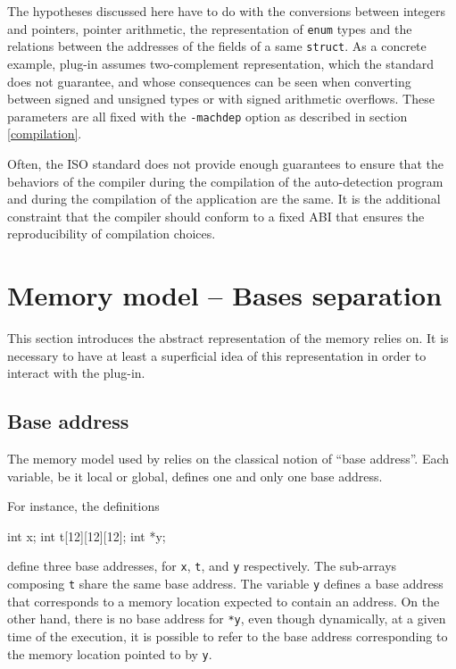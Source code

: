 \documentclass{frama-c-book}
\begin{document}
The hypotheses discussed here have to do with the conversions
between integers and pointers, pointer arithmetic, the representation
of \lstinline|enum| types and the relations between the addresses of the
fields of a same \lstinline|struct|. As a concrete example, \Eva{}
plug-in assumes two-complement representation,
which the standard does not guarantee,
and whose consequences can be seen when converting between
signed and unsigned types or with signed arithmetic overflows.
These parameters are all fixed with the \lstinline|-machdep| option
as described in section \ref{compilation}.

Often, the ISO standard does not provide enough guarantees to
ensure that the behaviors of the compiler during the compilation
of the auto-detection program and during the compilation of the application
are the same. It is the additional constraint that the compiler should conform
to a fixed ABI that ensures the reproducibility of compilation choices.

\section{Memory model -- Bases separation}\label{bases}

This section introduces the abstract representation of the memory
\Eva{} relies on. It is necessary to have
at least a superficial idea of this representation in order to
interact with the plug-in.

\subsection{Base address}
The memory model used by \Eva{} relies on the classical notion
of ``base address''. Each variable, be it local or global, defines one
and only one base address.
\goodbreak

For instance, the definitions
\begin{listing}{1}
int x;
int t[12][12][12];
int *y;
\end{listing}
define three base addresses, for \lstinline|x|,
\lstinline|t|, and \lstinline|y| respectively.
The sub-arrays composing \lstinline|t| share the same base address.
The variable \lstinline|y| defines a base address that corresponds to
a memory location expected to contain an address.
On the other hand, there is no base address for \lstinline|*y|, even
though dynamically, at a given time of the execution, it is
possible to refer to the base address corresponding to the memory
location pointed to by \lstinline|y|.
\end{document}
